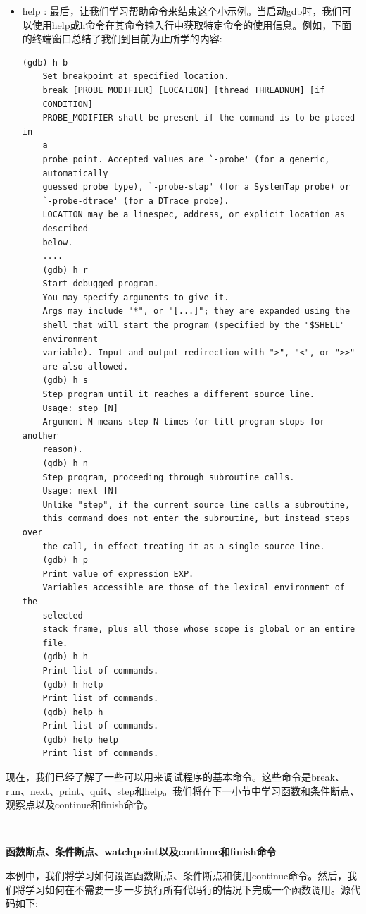 \begin{itemize}
\begin{lstlisting}[caption={}]
		14 float s = x + y;
		(gdb) n
		15 return s;
		(gdb) p s
		$1 = 30
	\end{lstlisting}
	\item help : 最后，让我们学习帮助命令来结束这个小示例。当启动gdb时，我们可以使用help或h命令在其命令输入行中获取特定命令的使用信息。例如，下面的终端窗口总结了我们到目前为止所学的内容:
	\begin{lstlisting}[caption={}]
	(gdb) h b
	Set breakpoint at specified location.
	break [PROBE_MODIFIER] [LOCATION] [thread THREADNUM] [if
	CONDITION]
	PROBE_MODIFIER shall be present if the command is to be placed in
	a
	probe point. Accepted values are `-probe' (for a generic,
	automatically
	guessed probe type), `-probe-stap' (for a SystemTap probe) or
	`-probe-dtrace' (for a DTrace probe).
	LOCATION may be a linespec, address, or explicit location as
	described
	below.
	....
	(gdb) h r
	Start debugged program.
	You may specify arguments to give it.
	Args may include "*", or "[...]"; they are expanded using the
	shell that will start the program (specified by the "$SHELL"
	environment
	variable). Input and output redirection with ">", "<", or ">>"
	are also allowed.
	(gdb) h s
	Step program until it reaches a different source line.
	Usage: step [N]
	Argument N means step N times (or till program stops for another
	reason).
	(gdb) h n
	Step program, proceeding through subroutine calls.
	Usage: next [N]
	Unlike "step", if the current source line calls a subroutine,
	this command does not enter the subroutine, but instead steps over
	the call, in effect treating it as a single source line.
	(gdb) h p
	Print value of expression EXP.
	Variables accessible are those of the lexical environment of the
	selected
	stack frame, plus all those whose scope is global or an entire
	file.
	(gdb) h h
	Print list of commands.
	(gdb) h help
	Print list of commands.
	(gdb) help h
	Print list of commands.
	(gdb) help help
	Print list of commands.
	\end{lstlisting}
\end{itemize}

现在，我们已经了解了一些可以用来调试程序的基本命令。这些命令是break、run、next、print、quit、step和help。我们将在下一小节中学习函数和条件断点、观察点以及continue和finish命令。 \par

\noindent\textbf{}\ \par
\textbf{函数断点、条件断点、watchpoint以及continue和finish命令} \ \par
本例中，我们将学习如何设置函数断点、条件断点和使用continue命令。然后，我们将学习如何在不需要一步一步执行所有代码行的情况下完成一个函数调用。源代码如下: \par

